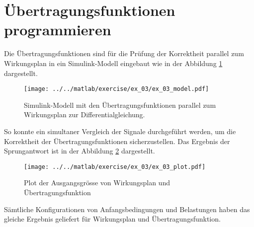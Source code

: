 \section{Übertragungsfunktionen programmieren}

Die Übertragungsfunktionen sind für die Prüfung der Korrektheit
parallel zum Wirkungsplan in ein Simulink-Modell eingebaut wie in der
Abbildung \ref{fig:ex_03_model} dargestellt.

\begin{figure}[h!]
	\centering
	\texttt{[image: ../../matlab/exercise/ex\_03/ex\_03\_model.pdf]}
	\caption{Simulink-Modell mit den Übertragungsfunktionen parallel zum 
		Wirkungsplan zur Differentialgleichung.}
	\label{fig:ex_03_model}
\end{figure}

So konnte ein simultaner Vergleich der Signale durchgeführt werden, um
die Korrektheit der Übertragungsfunktionen sicherzustellen. Das Ergebnis
der Sprungantwort ist in der Abbildung \ref{fig:ex_03_plot} dargestellt.

\begin{figure}[h!]
	\centering
	\texttt{[image: ../../matlab/exercise/ex\_03/ex\_03\_plot.pdf]}
	\caption{Plot der Ausgangsgrösse von Wirkungsplan und
		Übertragungsfunktion}
	\label{fig:ex_03_plot}
\end{figure}

Sämtliche Konfigurationen von Anfangsbedingungen und Belastungen haben das
gleiche Ergebnis geliefert für Wirkungsplan und Übertragungsfunktion.
